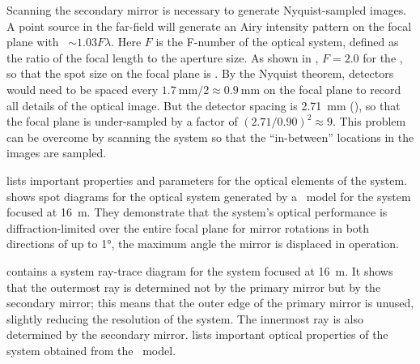 Scanning the secondary mirror is necessary to generate Nyquist-sampled images.
A point source in the far-field will generate an Airy intensity pattern on the focal plane with \FWHM\ $\sim 1.03 F \lambda$.
Here $F$ is the F-number of the optical system, defined as the ratio of the focal length to the aperture size.
As shown in , $F = 2.0$ for the \Imager, so that the spot size on the focal plane is .
By the Nyquist theorem, detectors would need to be spaced every $ \SI{1.7}{\mm} / 2 \approx \SI{0.9}{\mm}$ on the focal plane to record all details of the optical image.
But the detector spacing is \SI{2.71}{\mm} (), so that the focal plane is under-sampled by a factor of $ (2.71/0.90)^2 \approx 9$.
This problem can be overcome by scanning the system so that the ``in-between'' locations in the images are sampled. 

 lists important properties and parameters for the optical elements of the system.
 shows spot diagrams for the optical system generated by a \ZEMAX\ model for the system focused at \SI{16}{\m}.
They demonstrate that the system's optical performance is diffraction-limited over the entire focal plane for mirror rotations in both directions of up to \ang{1}, the maximum angle the mirror is displaced in operation.

 contains a system ray-trace diagram for the system focused at \SI{16}{\m}.
It shows that the outermost ray is determined not by the primary mirror but by the secondary mirror; this means that the outer edge of the primary mirror is unused, slightly reducing the resolution of the system.
The innermost ray is also determined by the secondary mirror.
 lists important optical properties of the system obtained from the \ZEMAX\ model.

